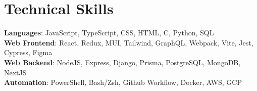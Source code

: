 \documentclass[letterpaper,11pt]{article}
\begin{document}
\section{Technical Skills}
 \begin{itemize}[leftmargin=0.15in, label={}]
    \small{\item{
      \textbf{Languages}{: JavaScript, TypeScript, CSS, HTML, C, Python, SQL} \\
      \textbf{Web Frontend}{: React, Redux, MUI, Tailwind, GraphQL, Webpack, Vite, Jest, Cypress, Figma} \\
      \textbf{Web Backend}{: NodeJS, Express, Django, Prisma, PostgreSQL, MongoDB, NextJS}\\
      \textbf{Automation}{: PowerShell, Bash/Zsh, Github Workflow, Docker, AWS, GCP}
     }}
 \end{itemize}


\end{document}
